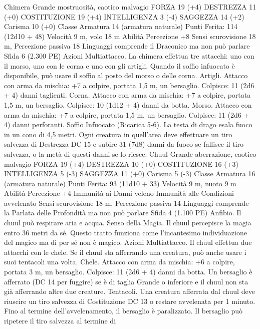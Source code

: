 \begin{multicols}{2}
Chimera
Grande mostruosità, caotico malvagio
FORZA 19 (+4)
DESTREZZA 11 (+0)
COSTITUZIONE 19 (+4)
INTELLIGENZA 3 (-4)
SAGGEZZA 14 (+2)
Carisma 10 (+0)
Classe Armatura 14 (armatura naturale)
\hspace*{0pt}\hfill{Punti Ferita}: 114 (12d10 + 48)
Velocità 9 m, volo 18 m
Abilità Percezione +8
Sensi scurovisione 18 m, Percezione passiva 18
Linguaggi comprende il Draconico ma non può parlare
Sfida 6 (2.300 PE)
Azioni
Multiattacco. La chimera effettua tre attacchi: uno con il morso,
uno con le corna e uno con gli artigli. Quando il soffio infuocato
è disponibile, può usare il soffio al posto del morso o delle corna.
Artigli. Attacco con arma da mischia: +7 a colpire, portata 1,5
m, un bersaglio.
Colpisce: 11 (2d6 + 4) danni taglienti.
Corna. Attacco con arma da mischia: +7 a colpire, portata 1,5 m,
un bersaglio.
Colpisce: 10 (1d12 + 4) danni da botta.
Morso. Attacco con arma da mischia: +7 a colpire, portata 1,5
m, un bersaglio.
Colpisce: 11 (2d6 + 4) danni perforanti.
Soffio Infuocato (Ricarica 5-6). La testa di drago esala fuoco in
un cono di 4,5 metri. Ogni creatura in quell’area deve effettuare
un tiro salvezza di Destrezza DC 15 e subire 31 (7d8) danni da
fuoco se fallisce il tiro salvezza, o la metà di questi danni se lo
riesce.
Chuul
Grande aberrazione, caotico malvagio
FORZA 19 (+4)
DESTREZZA 10 (+0)
COSTITUZIONE 16 (+3)
INTELLIGENZA 5 (-3)
SAGGEZZA 11 (+0)
Carisma 5 (-3)
Classe Armatura 16 (armatura naturale)
\hspace*{0pt}\hfill{Punti Ferita}: 93 (11d10 + 33)
Velocità 9 m, nuoto 9 m
Abilità Percezione +4
Immunità ai Danni veleno
Immunità alle Condizioni avvelenato
Sensi scurovisione 18 m, Percezione passiva 14
Linguaggi comprende la Parlata delle Profondità ma non può
parlare
Sfida 4 (1.100 PE)
Anfibio. Il chuul può respirare aria e acqua.
Senso della Magia. Il chuul percepisce la magia entro 36 metri
da sé. Questo tratto funziona come l’incantesimo individuazione
del magico ma di per sé non è magico.
Azioni
Multiattacco. Il chuul effettua due attacchi con le chele. Se il
chuul sta afferrando una creatura, può anche usare i suoi
tentacoli una volta.
Chele. Attacco con arma da mischia: +6 a colpire, portata 3 m,
un bersaglio.
Colpisce: 11 (2d6 + 4) danni da botta. Un bersaglio è
afferrato (DC 14 per fuggire) se è di taglia Grande o inferiore e il
chuul non sta già afferrando altre due creature.
Tentacoli. Una creatura afferrata dal chuul deve riuscire un tiro
salvezza di Costituzione DC 13 o restare avvelenata per 1
minuto. Fino al termine dell’avvelenamento, il bersaglio è
paralizzato. Il bersaglio può ripetere il tiro salvezza al termine di

\end{multicols}
